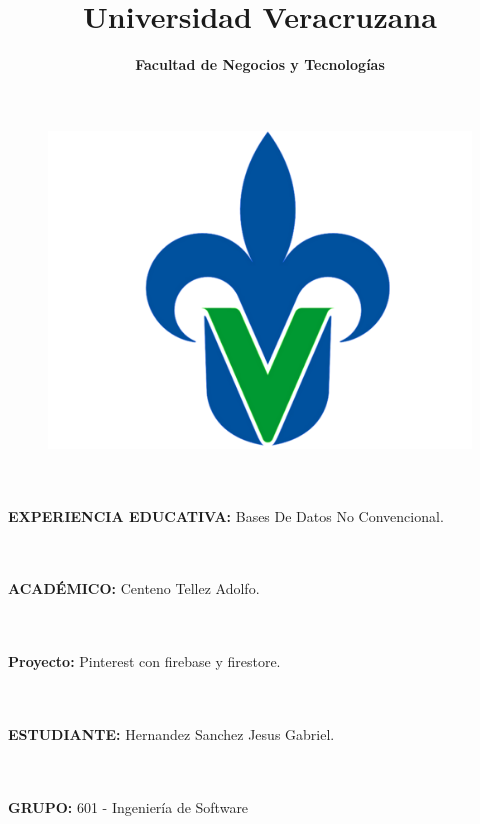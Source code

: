 \documentclass[60pt]{article}
\title{\textbf{Universidad Veracruzana}}
\date{\textbf{Facultad de Negocios y Tecnologías}}
\begin{document}
\maketitle
\begin{figure}[htb]
\centering
\includegraphics[width=0.5\linewidth]{logo.png}
\end{figure}

\maketitle
\textsf{\Large 
\\
\\
\textbf{EXPERIENCIA EDUCATIVA:} Bases De Datos No Convencional. \\}
\\
\\ 
\maketitle
\textsf{\Large \textbf{ACADÉMICO:} Centeno Tellez Adolfo. \\}
\\
\\
\maketitle
\textsf{\Large \textbf{Proyecto:} Pinterest con firebase y firestore. \\}
\\
\\
\maketitle
\textsf{\Large \textbf{ESTUDIANTE:} Hernandez Sanchez Jesus Gabriel. \\}
\\
\\ 
\maketitle
\textsf{\Large \textbf{GRUPO:} 601 - Ingeniería de Software \\}
\\
\\
\end{document}
